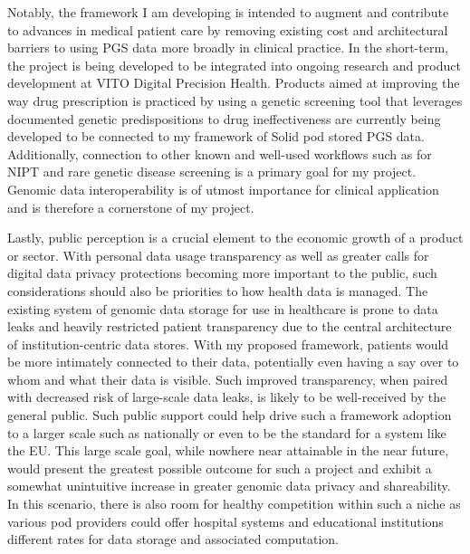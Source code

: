 \documentclass{article}
\begin{document}
Notably, the framework I am developing is intended to augment and contribute to advances in medical patient care by removing existing cost and architectural barriers to using PGS data more broadly in clinical practice. In the short-term, the project is being developed to be integrated into ongoing research and product development at VITO Digital Precision Health. Products aimed at improving the way drug prescription is practiced by using a genetic screening tool that leverages documented genetic predispositions to drug ineffectiveness are currently being developed to be connected to my framework of Solid pod stored PGS data. Additionally, connection to other known and well-used workflows such as for NIPT and rare genetic disease screening is a primary goal for my project. Genomic data interoperability is of utmost importance for clinical application and is therefore a cornerstone of my project. 

Lastly, public perception is a crucial element to the economic growth of a product or sector. With personal data usage transparency as well as greater calls for digital data privacy protections becoming more important to the public, such considerations should also be priorities to how health data is managed. The existing system of genomic data storage for use in healthcare is prone to data leaks and heavily restricted patient transparency due to the central architecture of institution-centric data stores. With my proposed framework, patients would be more intimately connected to their data, potentially even having a say over to whom and what their data is visible. Such improved transparency, when paired with decreased risk of large-scale data leaks, is likely to be well-received by the general public. Such public support could help drive such a framework adoption to a larger scale such as nationally or even to be the standard for a system like the EU. This large scale goal, while nowhere near attainable in the near future, would present the greatest possible outcome for such a project and exhibit a somewhat unintuitive increase in greater genomic data privacy and shareability. In this scenario, there is also room for healthy competition within such a niche as various pod providers could offer hospital systems and educational institutions different rates for data storage and associated computation.


    

\end{document}
